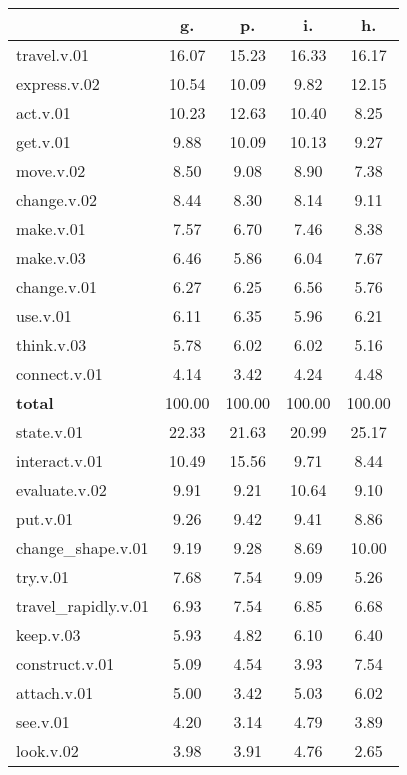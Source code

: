 \begin{table}[h!]
\begin{center}
\begin{tabular}{| l || c | c | c | c |}\hline
 & {\bf g.} & {\bf p.} & {\bf i.} & {\bf h.} \\\hline\hline
travel.v.01 & 16.07  & 15.23  & 16.33  & 16.17 \\\hline
express.v.02 & 10.54  & 10.09  & 9.82  & 12.15 \\\hline
act.v.01 & 10.23  & 12.63  & 10.40  & 8.25 \\\hline
get.v.01 & 9.88  & 10.09  & 10.13  & 9.27 \\\hline
move.v.02 & 8.50  & 9.08  & 8.90  & 7.38 \\\hline
change.v.02 & 8.44  & 8.30  & 8.14  & 9.11 \\\hline
make.v.01 & 7.57  & 6.70  & 7.46  & 8.38 \\\hline
make.v.03 & 6.46  & 5.86  & 6.04  & 7.67 \\\hline
change.v.01 & 6.27  & 6.25  & 6.56  & 5.76 \\\hline
use.v.01 & 6.11  & 6.35  & 5.96  & 6.21 \\\hline
think.v.03 & 5.78  & 6.02  & 6.02  & 5.16 \\\hline
connect.v.01 & 4.14  & 3.42  & 4.24  & 4.48 \\\hline\hline
{{\bf total}} & 100.00  & 100.00  & 100.00  & 100.00 \\\hline\hline\hline
state.v.01 & 22.33  & 21.63  & 20.99  & 25.17 \\\hline
interact.v.01 & 10.49  & 15.56  & 9.71  & 8.44 \\\hline
evaluate.v.02 & 9.91  & 9.21  & 10.64  & 9.10 \\\hline
put.v.01 & 9.26  & 9.42  & 9.41  & 8.86 \\\hline
change\_shape.v.01 & 9.19  & 9.28  & 8.69  & 10.00 \\\hline
try.v.01 & 7.68  & 7.54  & 9.09  & 5.26 \\\hline
travel\_rapidly.v.01 & 6.93  & 7.54  & 6.85  & 6.68 \\\hline
keep.v.03 & 5.93  & 4.82  & 6.10  & 6.40 \\\hline
construct.v.01 & 5.09  & 4.54  & 3.93  & 7.54 \\\hline
attach.v.01 & 5.00  & 3.42  & 5.03  & 6.02 \\\hline
see.v.01 & 4.20  & 3.14  & 4.79  & 3.89 \\\hline
look.v.02 & 3.98  & 3.91  & 4.76  & 2.65 \\\hline\hline

\end{tabular}
\end{center}
\end{table}
